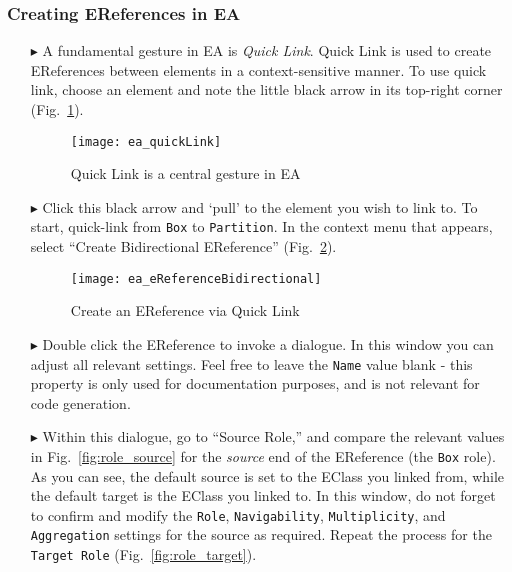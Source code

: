 \newpage
\subsubsection{Creating EReferences in EA}
\visHeader
\hypertarget{static:references vis}{}

\begin{itemize}

\item[$\blacktriangleright$] A fundamental gesture in EA is \emph{Quick Link}. Quick Link is used to create EReferences between elements in a context-sensitive
manner. To use quick link, choose an element and note the little black arrow in its top-right corner (Fig.~\ref{fig:quicklink}).

\begin{figure}[htbp]
	\centering
  \texttt{[image: ea\_quickLink]}
	\caption{Quick Link is a central gesture in EA}
	\label{fig:quicklink}
\end{figure}
\FloatBarrier

\item[$\blacktriangleright$] Click this black arrow and `pull' to the element you wish to link to. To start, quick-link from \texttt{Box} to \texttt{Partition}.
In the context menu that appears, select ``Create Bidirectional EReference'' (Fig.~\ref{fig:ereference}).

\begin{figure}[htbp]
	\centering
  \texttt{[image: ea\_eReferenceBidirectional]}
	\caption{Create an EReference via Quick Link}
	\label{fig:ereference}
\end{figure}
\FloatBarrier

\item[$\blacktriangleright$] Double click the EReference to invoke a dialogue. In this window you can adjust all relevant settings. Feel free to leave the
\texttt{Name} value blank - this property is only used for documentation purposes, and is not relevant for code generation.

\item[$\blacktriangleright$] Within this dialogue, go to ``Source Role,'' and compare the relevant values in Fig.~\ref{fig:role_source} for the \emph{source}
end of the EReference (the \texttt{Box} role). As you can see, the default source is set to the EClass you linked from, while the default target
is the EClass you linked to. In this window, do not forget to confirm and modify the \texttt{Role}, \texttt{Navigability}, \texttt{Multiplicity}, and
\texttt{Aggregation} settings for the source as required. Repeat the process for the \texttt{Target Role} (Fig.~\ref{fig:role_target}).


\end{itemize}
